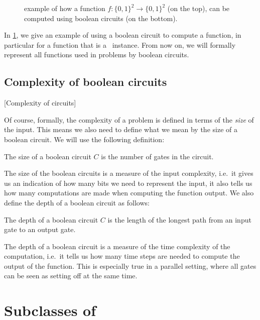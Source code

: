 \begin{figure}
	\centering
	\caption[Computing a function with circuits]{example of how a function $f : \{0, 1\}^2 \rightarrow \{0, 1\}^2$ (on the top), can be computed using boolean circuits (on the bottom).}
	\label{fig:computing_function_example}
\end{figure}

In \cref{fig:computing_function_example}, we give an example of using a boolean circuit to compute a function, in particular for a function that is a \Tarski\ instance. From now on, we will formally represent all functions used in problems by boolean circuits.

\subsection{Complexity of boolean circuits}[Complexity of circuits]

Of course, formally, the complexity of a problem is defined in terms of the \emph{size} of the input. This means we also need to define what we mean by the size of a boolean circuit. We will use the following definition:

\begin{definition}
	The size of a boolean circuit $C$ is the number of gates in the circuit.
\end{definition}

The size of the boolean circuits is a measure of the input complexity, i.e.\ it gives us an indication of how many bits we need to represent the input, it also tells us how many computations are made when computing the function output. We also define the depth of a boolean circuit as follows:

\begin{definition}
	The depth of a boolean circuit $C$ is the length of the longest path from an input gate to an output gate.
\end{definition}

The depth of a boolean circuit is a measure of the time complexity of the computation, i.e.\ it tells us how many time steps are needed to compute the output of the function. This is especially true in a parallel setting, where all gates can be seen as setting off at the same time.

\section{Subclasses of \TFNP}

